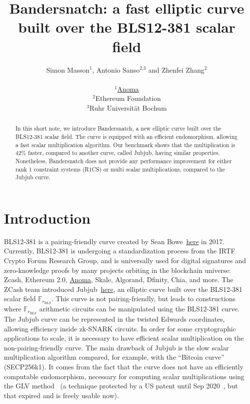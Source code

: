 \documentclass{article}
\title{Bandersnatch: a fast elliptic curve built over the BLS12-381
  scalar field}
\author{Simon Masson${}^\text{1}$, Antonio Sanso${}^\text{2,3}$ and
  Zhenfei Zhang${}^\text{2}$\\
  \ \\
  ${}^\text{1}$\href{https://anoma.network}{Anoma}\\
  ${}^\text{2}$Ethereum Foundation\\
  ${}^\text{3}$Ruhr Universit{\"a}t Bochum\\
}
\date{}
\makeatletter
\theoremstyle{definition}
\newcommand{\verbatimfont}[1]{\renewcommand{\verbatim@font}{\ttfamily#1}}
\makeatother
\begin{document}
\verbatimfont{\small}%

\maketitle
\medskip
\begin{abstract}
 In this short note, we introduce Bandersnatch, a new elliptic curve
 built over the BLS12-381 scalar field. The curve is equipped with an efficient
 endomorphism, allowing a fast scalar multiplication algorithm.
 Our benchmark shows that the multiplication is 42\% faster, 
 compared to another curve, called Jubjub, having similar
 properties. Nonetheless, Bandersnatch does not provide any
 performance improvement for either rank 1 constraint systems (R1CS)
 or multi scalar multiplications, compared to the Jubjub curve.
\end{abstract}

\section{Introduction}
BLS12-381 is a pairing-friendly curve created by Sean
Bowe~\href{https://electriccoin.co/blog/new-snark-curve/}{here} in 2017.
Currently, BLS12-381 is undergoing a standardization process 
from the
IRTF Crypto Forum Research Group, and is
universally used for digital
signatures and zero-knowledge proofs by many projects orbiting in the
blockchain universe: Zcash, Ethereum 2.0, \href{https://anoma.network}{Anoma}, Skale, Algorand, Dfinity,
Chia, and more.
The ZCash team
introduced Jubjub~\href{https://z.cash/technology/jubjub/}{here}, an
elliptic curve built over the BLS12-381 scalar field $\mathbb
F_{r_\text{BLS}}$.
This curve is not pairing-friendly, but leads to constructions where
$\mathbb F_{r_\text{BLS}}$ arithmetic circuits can be manipulated
using the BLS12-381 curve.
The Jubjub curve can be represented in the twisted Edwards
coordinates, allowing efficiency inside zk-SNARK circuits.
In order for some cryptographic applications to scale, it is necessary to
have efficient scalar multiplication on the non-pairing-friendly
curve.
The main drawback of Jubjub is the slow scalar multiplication
algorithm compared, for example, with the ``Bitcoin curve''
(SECP256k1).
It comes from the fact that the curve does not have an efficiently
computable endomorphism, necessary for computing scalar
multiplications using the GLV method~\cite{C:GalLamVan01} (a technique
protected by a US patent until Sep 2020~\cite{glvpatent}, but that 
expired and is
freely usable now).
\end{document}
